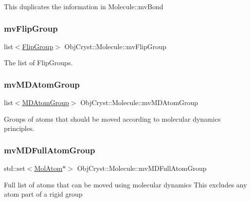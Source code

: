 This duplicates the information in Molecule\+::mv\+Bond \mbox{\label{class_obj_cryst_1_1_molecule_a79ffe8ba3222a5f4a56fd9f2447c8fd7}} 
\subsubsection{\texorpdfstring{mvFlipGroup}{mvFlipGroup}}
{\footnotesize\ttfamily list$<$\mbox{\hyperlink{struct_obj_cryst_1_1_molecule_1_1_flip_group}{Flip\+Group}}$>$ Obj\+Cryst\+::\+Molecule\+::mv\+Flip\+Group\hspace{0.3cm}{\ttfamily [mutable]}}

The list of Flip\+Groups. \mbox{\label{class_obj_cryst_1_1_molecule_a4a3a91c91753e90de67341701df7e081}} 
\subsubsection{\texorpdfstring{mvMDAtomGroup}{mvMDAtomGroup}}
{\footnotesize\ttfamily list$<$\mbox{\hyperlink{struct_obj_cryst_1_1_m_d_atom_group}{M\+D\+Atom\+Group}}$>$ Obj\+Cryst\+::\+Molecule\+::mv\+M\+D\+Atom\+Group\hspace{0.3cm}{\ttfamily [mutable]}}

Groups of atoms that should be moved according to molecular dynamics principles. \mbox{\label{class_obj_cryst_1_1_molecule_af3e1420d9c1c4cc3be0e58c5834130e7}} 
\subsubsection{\texorpdfstring{mvMDFullAtomGroup}{mvMDFullAtomGroup}}
{\footnotesize\ttfamily std\+::set$<$\mbox{\hyperlink{class_obj_cryst_1_1_mol_atom}{Mol\+Atom}}$\ast$$>$ Obj\+Cryst\+::\+Molecule\+::mv\+M\+D\+Full\+Atom\+Group\hspace{0.3cm}{\ttfamily [mutable]}}

Full list of atoms that can be moved using molecular dynamics This excludes any atom part of a rigid group \mbox{\label{class_obj_cryst_1_1_molecule_ad498c51ecf4ee0b4482e5fe41cd52be7}} 
